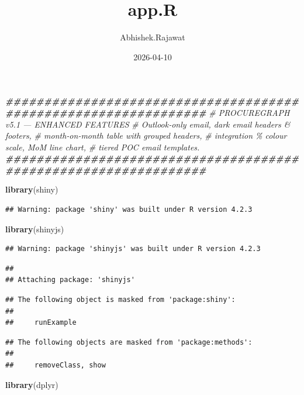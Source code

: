 \documentclass[
]{article}
\title{app.R}
\author{Abhishek.Rajawat}
\date{2026-04-10}
\newenvironment{Shaded}{\begin{snugshade}}{\end{snugshade}}
\newcommand{\CommentTok}[1]{\textcolor[rgb]{0.56,0.35,0.01}{\textit{#1}}}
\newcommand{\DocumentationTok}[1]{\textcolor[rgb]{0.56,0.35,0.01}{\textbf{\textit{#1}}}}
\newcommand{\FunctionTok}[1]{\textcolor[rgb]{0.13,0.29,0.53}{\textbf{#1}}}
\newcommand{\NormalTok}[1]{#1}
\begin{document}
\maketitle

\begin{Shaded}
\begin{Highlighting}[]
\DocumentationTok{\#\#\#\#\#\#\#\#\#\#\#\#\#\#\#\#\#\#\#\#\#\#\#\#\#\#\#\#\#\#\#\#\#\#\#\#\#\#\#\#\#\#\#\#\#\#\#\#\#\#\#\#\#\#\#\#\#\#\#\#\#\#\#\#}
\CommentTok{\# PROCUREGRAPH v5.1 — ENHANCED FEATURES}
\CommentTok{\# Outlook‑only email, dark email headers \& footers,}
\CommentTok{\# month‑on‑month table with grouped headers,}
\CommentTok{\# integration \% colour scale, MoM line chart,}
\CommentTok{\# tiered POC email templates.}
\DocumentationTok{\#\#\#\#\#\#\#\#\#\#\#\#\#\#\#\#\#\#\#\#\#\#\#\#\#\#\#\#\#\#\#\#\#\#\#\#\#\#\#\#\#\#\#\#\#\#\#\#\#\#\#\#\#\#\#\#\#\#\#\#\#\#\#\#}

\FunctionTok{library}\NormalTok{(shiny)}
\end{Highlighting}
\end{Shaded}

\begin{verbatim}
## Warning: package 'shiny' was built under R version 4.2.3
\end{verbatim}

\begin{Shaded}
\begin{Highlighting}[]
\FunctionTok{library}\NormalTok{(shinyjs)}
\end{Highlighting}
\end{Shaded}

\begin{verbatim}
## Warning: package 'shinyjs' was built under R version 4.2.3
\end{verbatim}

\begin{verbatim}
## 
## Attaching package: 'shinyjs'
\end{verbatim}

\begin{verbatim}
## The following object is masked from 'package:shiny':
## 
##     runExample
\end{verbatim}

\begin{verbatim}
## The following objects are masked from 'package:methods':
## 
##     removeClass, show
\end{verbatim}

\begin{Shaded}
\begin{Highlighting}[]
\FunctionTok{library}\NormalTok{(dplyr)}
\end{Highlighting}
\end{Shaded}
\end{document}

